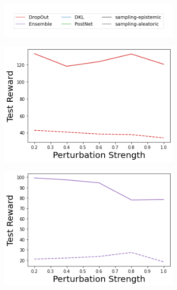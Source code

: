 \begin{figure}
    \centering
        \vspace{-3mm}
    \begin{subfigure}{.45\textwidth}
        \includegraphics[width=\textwidth]{sections/011_icml2022/resources/sampling-legend.png}
    \end{subfigure}
    \vspace{-3mm}
    
    \begin{subfigure}{.245\textwidth}
        \includegraphics[width=\textwidth]{sections/011_icml2022/resources/transition_shift-DropOut-CartPoleShift-v0-mean_reward_.png}
    \end{subfigure}
    \begin{subfigure}{.245\textwidth}
        \includegraphics[width=\textwidth]{sections/011_icml2022/resources/transition_shift-Ensemble-CartPoleShift-v0-mean_reward_.png}

\end{subfigure}
\end{figure}
